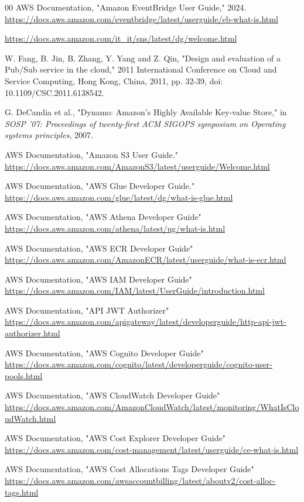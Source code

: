 \begin{thebibliography}{00}
AWS Documentation, "Amazon EventBridge User Guide," 2024. \url{https://docs.aws.amazon.com/eventbridge/latest/userguide/eb-what-is.html}

\url{https://docs.aws.amazon.com/it_it/sns/latest/dg/welcome.html}

W. Fang, B. Jin, B. Zhang, Y. Yang and Z. Qin, "Design and evaluation of a Pub/Sub service in the cloud," 2011 International Conference on Cloud and Service Computing, Hong Kong, China, 2011, pp. 32-39, doi: 10.1109/CSC.2011.6138542.

G. DeCandia et al., "Dynamo: Amazon's Highly Available Key-value Store," in \textit{SOSP '07: Proceedings of twenty-first ACM SIGOPS symposium on Operating systems principles}, 2007.

AWS Documentation, "Amazon S3 User Guide." \url{https://docs.aws.amazon.com/AmazonS3/latest/userguide/Welcome.html}

AWS Documentation, "AWS Glue Developer Guide." \url{https://docs.aws.amazon.com/glue/latest/dg/what-is-glue.html}

AWS Documentation, "AWS Athena Developer Guide"
\url{https://docs.aws.amazon.com/athena/latest/ug/what-is.html}

AWS Documentation, "AWS ECR Developer Guide"
\url{https://docs.aws.amazon.com/AmazonECR/latest/userguide/what-is-ecr.html}

AWS Documentation, "AWS IAM Developer Guide"
\url{https://docs.aws.amazon.com/IAM/latest/UserGuide/introduction.html}

AWS Documentation, "API JWT Authorizer"
\url{https://docs.aws.amazon.com/apigateway/latest/developerguide/http-api-jwt-authorizer.html}

AWS Documentation, "AWS Cognito Developer Guide"
\url{https://docs.aws.amazon.com/cognito/latest/developerguide/cognito-user-pools.html}

AWS Documentation, "AWS CloudWatch Developer Guide"
\url{https://docs.aws.amazon.com/AmazonCloudWatch/latest/monitoring/WhatIsCloudWatch.html}

AWS Documentation, "AWS Cost Explorer Developer Guide"
\url{https://docs.aws.amazon.com/cost-management/latest/userguide/ce-what-is.html}

AWS Documentation, "AWS Cost Allocations Tags Developer Guide"
\url{https://docs.aws.amazon.com/awsaccountbilling/latest/aboutv2/cost-alloc-tags.html}


\end{thebibliography}
